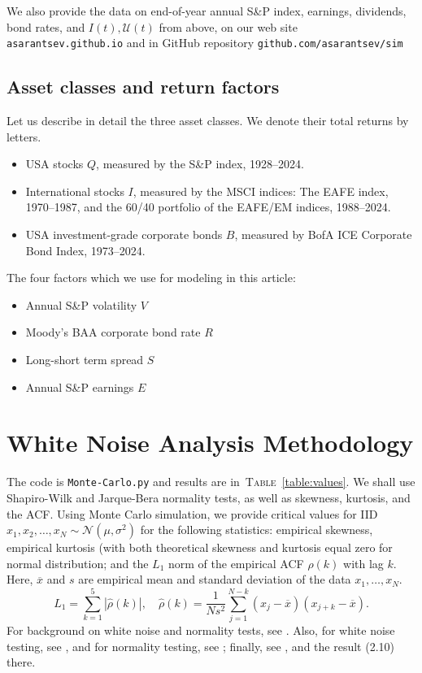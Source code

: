 \documentclass[12pt]{amsart}
\begin{document}
We also provide the data on end-of-year annual S\&P index, earnings, dividends, bond rates, and $I(t), \mathcal U(t)$ from above, on our web site \texttt{asarantsev.github.io} and in GitHub repository \texttt{github.com/asarantsev/sim}

\subsection{Asset classes and return factors} Let us describe in detail the three asset classes. We denote their total returns by letters. 

\begin{itemize}
\item USA stocks $Q$, measured by the S\&P index, 1928--2024.
\item International stocks $I$, measured by the MSCI indices: The EAFE index, 1970--1987, and the 60/40 portfolio of the EAFE/EM indices, 1988--2024.
\item USA investment-grade corporate bonds $B$, measured by BofA ICE Corporate Bond Index, 1973--2024.
\end{itemize}

The four factors which we use for modeling in this article:

\begin{itemize}
\item Annual S\&P volatility $V$
\item Moody's BAA corporate bond rate $R$
\item Long-short term spread $S$
\item Annual S\&P earnings $E$
\end{itemize}

\section{White Noise Analysis Methodology}

The code is \texttt{Monte-Carlo.py} and results are in~\textsc{Table}~\ref{table:values}. We shall use Shapiro-Wilk and Jarque-Bera normality tests, as well as skewness, kurtosis, and the ACF. Using Monte Carlo simulation, we provide critical values for IID $x_1, x_2, \ldots, x_N \sim \mathcal N(\mu, \sigma^2)$ for the following statistics: empirical skewness, empirical kurtosis (with both  theoretical skewness and kurtosis equal zero for normal distribution; and the $L_1$ norm of the empirical ACF $\hat{\rho}(k)$ with lag $k$. Here, $\overline{x}$ and $s$ are empirical mean and standard deviation of the data $x_1, \ldots, x_N$.  
$$
L_1 = \sum_{k=1}^5|\hat{\rho}(k)|,\quad \hat{\rho}(k) = \frac1{Ns^2}\sum\limits_{j=1}^{N-k}(x_j - \overline{x})(x_{j+k} - \overline{x}).
$$
For background on white noise and normality tests, see \cite[Chapter 1, Section 6]{Series}. Also, for white noise testing, see \cite[Chapter 1, Sections 2, 4]{Textbook},  and for normality testing, see \cite[Chapter 1, Section 5]{Textbook}; finally, see \cite[Chapter 2, Section 6]{Textbook}, and the result (2.10) there. 
\end{document}
